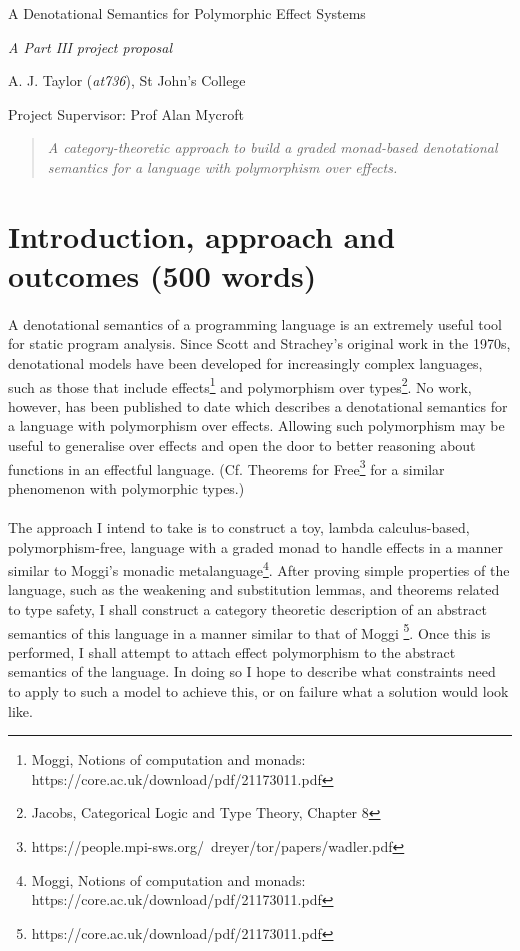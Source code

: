 \documentclass[11pt]{article}
\begin{document}
\centerline{\Large A Denotational Semantics for Polymorphic Effect Systems}
\vspace{2em}
\centerline{\Large \emph{A Part III project proposal}}
\vspace{2em}
\centerline{\large A. J. Taylor (\emph{at736}), St John's College}
\vspace{1em}
\centerline{\large Project Supervisor: Prof Alan Mycroft}
\vspace{1em}

\begin{abstract}
\textsl{
	A category-theoretic approach to build a graded monad-based denotational semantics for a language with polymorphism over effects.
} 
\end{abstract}

\section{Introduction, approach and outcomes (500 words)}
  
\paragraph{}{
A denotational semantics of a programming language is an extremely useful tool for static program analysis. Since Scott and Strachey's original work in the 1970s, denotational models have been developed for increasingly complex languages, such as those that include effects\footnote{Moggi, Notions of computation and monads: https://core.ac.uk/download/pdf/21173011.pdf} and polymorphism over types\footnote{ Jacobs, Categorical Logic and Type Theory, Chapter 8}. No work, however, has been published to date which describes a denotational semantics for a language with polymorphism over effects. Allowing such polymorphism may be useful to generalise over effects and open the door to better reasoning about functions in an effectful language. (Cf. Theorems for Free\footnote{https://people.mpi-sws.org/~dreyer/tor/papers/wadler.pdf} for a similar phenomenon with polymorphic types.)}




\paragraph{}{
The approach I intend to take is to construct a toy, lambda calculus-based, polymorphism-free, language with a graded monad to handle effects in a manner similar to Moggi's monadic metalanguage\footnote{Moggi, Notions of computation and monads: https://core.ac.uk/download/pdf/21173011.pdf}. After proving simple properties of the language, such as the weakening and substitution lemmas, and theorems related to type safety, I shall construct a category theoretic description of an abstract semantics of this language in a manner similar to that of Moggi \footnote{https://core.ac.uk/download/pdf/21173011.pdf}. Once this is performed, I shall attempt to attach effect polymorphism to the abstract semantics of the language. In doing so I hope to describe what constraints need to apply to such a model to achieve this, or on failure what a solution would look like.}
\end{document}
